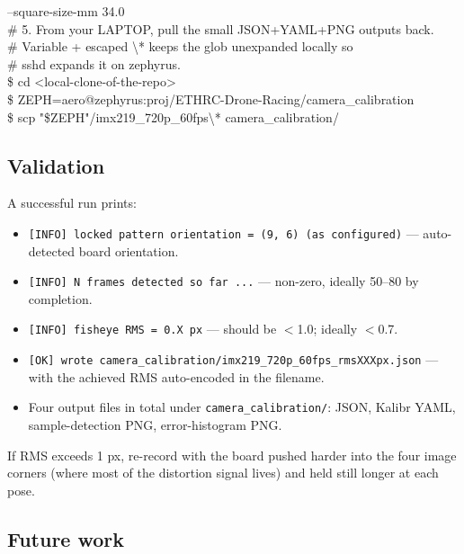 \documentclass[11pt,a4paper]{article}
\begin{document}
\begin{codebox}
\quad   --square-size-mm 34.0\\[6pt]
\textcolor{ethMuted}{\# 5. From your LAPTOP, pull the small JSON+YAML+PNG outputs back.}\\
\textcolor{ethMuted}{\#    Variable + escaped \textbackslash{}* keeps the glob unexpanded locally so}\\
\textcolor{ethMuted}{\#    sshd expands it on zephyrus.}\\
\$ cd <local-clone-of-the-repo>\\
\$ ZEPH=aero@zephyrus:proj/ETHRC-Drone-Racing/camera\_calibration\\
\$ scp "\$ZEPH"/imx219\_720p\_60fps\textbackslash{}* camera\_calibration/
\end{codebox}

\subsection{Validation}

A successful run prints:
\begin{itemize}[leftmargin=18pt, itemsep=2pt]
\item \texttt{{[}INFO{]} locked pattern orientation = (9, 6) (as configured)} --- auto-detected board orientation.
\item \texttt{{[}INFO{]} N frames detected so far ...} --- non-zero, ideally 50--80 by completion.
\item \texttt{{[}INFO{]} fisheye RMS = 0.X px} --- should be $<$1.0; ideally $<$0.7.
\item \texttt{{[}OK{]} wrote camera\_calibration/imx219\_720p\_60fps\_rmsXXXpx.json} --- with the achieved RMS auto-encoded in the filename.
\item Four output files in total under \texttt{camera\_calibration/}: JSON, Kalibr YAML, sample-detection PNG, error-histogram PNG.
\end{itemize}

If RMS exceeds 1 px, re-record with the board pushed harder into the four image corners (where most of the distortion signal lives) and held still longer at each pose.

\subsection{Future work}
\end{document}
